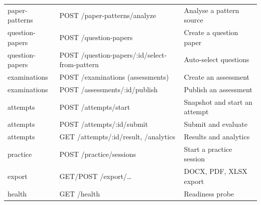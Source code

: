\begin{table}[H]
\begin{tabular}{@{}p{3.2cm}p{5.2cm}p{\dimexpr\textwidth-8.4cm-24pt\relax}@{}}
paper-patterns & POST /paper-patterns/analyze & Analyse a pattern source \\
question-papers & POST /question-papers & Create a question paper \\
question-papers & POST /question-papers/:id/select-from-pattern & Auto-select questions \\
examinations & POST /examinations (assessments) & Create an assessment \\
examinations & POST /assessments/:id/publish & Publish an assessment \\
attempts & POST /attempts/start & Snapshot and start an attempt \\
attempts & POST /attempts/:id/submit & Submit and evaluate \\
attempts & GET /attempts/:id/result, /analytics & Results and analytics \\
practice & POST /practice/sessions & Start a practice session \\
export & GET/POST /export/\ldots & DOCX, PDF, XLSX export \\
health & GET /health & Readiness probe \\
\bottomrule
\end{tabular}
\end{table}
